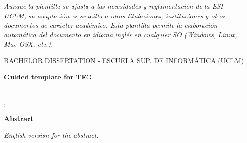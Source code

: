 \emph{Aunque la plantilla se ajusta a las necesidades y reglamentación de la ESI-UCLM, su adaptación es sencilla a otras titulaciones, instituciones y otros documentos de carácter académico. Esta plantilla permite la elaboración automática del documento en idioma inglés en cualquier SO (Windows, Linux, Mac OSX, etc.).}


\cleardoublepage %





\makeatletter
\begin{center} %
   {\textsc{BACHELOR DISSERTATION - ESCUELA SUP. DE INFORMÁTICA (UCLM)}\par}
   \vspace{1cm} %
   {\textbf{\Large Guided template for TFG}\par}
   \vspace{0.4cm} %
   {\@autor \\ \@cityTF,{} \@monthTF{} \@yearTF\par} 
   \vspace{0.9cm} %
   {\textbf{\large\textsf{Abstract}}\par} 
\end{center}   
\makeatother %
\emph{English version for the abstract.}
\cleardoublepage %


